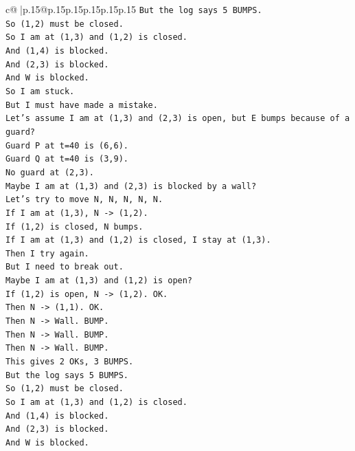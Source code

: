 \documentclass{article}
\begin{document}
{\begin{supertabular}{c@{$\;$}|p{.15\linewidth}@{}p{.15\linewidth}p{.15\linewidth}p{.15\linewidth}p{.15\linewidth}p{.15\linewidth}}
{{{\texttt{But the log says 5 BUMPS.} \\
\texttt{So (1,2) must be closed.} \\
\texttt{So I am at (1,3) and (1,2) is closed.} \\
\texttt{And (1,4) is blocked.} \\
\texttt{And (2,3) is blocked.} \\
\texttt{And W is blocked.} \\
\texttt{So I am stuck.} \\
\texttt{But I must have made a mistake.} \\
\texttt{Let's assume I am at (1,3) and (2,3) is open, but E bumps because of a guard?} \\
\texttt{Guard P at t=40 is (6,6).} \\
\texttt{Guard Q at t=40 is (3,9).} \\
\texttt{No guard at (2,3).} \\
\texttt{Maybe I am at (1,3) and (2,3) is blocked by a wall?} \\
\texttt{Let's try to move N, N, N, N, N.} \\
\texttt{If I am at (1,3), N {-}> (1,2).} \\
\texttt{If (1,2) is closed, N bumps.} \\
\texttt{If I am at (1,3) and (1,2) is closed, I stay at (1,3).} \\
\texttt{Then I try again.} \\
\texttt{But I need to break out.} \\
\texttt{Maybe I am at (1,3) and (1,2) is open?} \\
\texttt{If (1,2) is open, N {-}> (1,2). OK.} \\
\texttt{Then N {-}> (1,1). OK.} \\
\texttt{Then N {-}> Wall. BUMP.} \\
\texttt{Then N {-}> Wall. BUMP.} \\
\texttt{Then N {-}> Wall. BUMP.} \\
\texttt{This gives 2 OKs, 3 BUMPS.} \\
\texttt{But the log says 5 BUMPS.} \\
\texttt{So (1,2) must be closed.} \\
\texttt{So I am at (1,3) and (1,2) is closed.} \\
\texttt{And (1,4) is blocked.} \\
\texttt{And (2,3) is blocked.} \\
\texttt{And W is blocked.} \\
}}}
\end{supertabular}}
\end{document}
